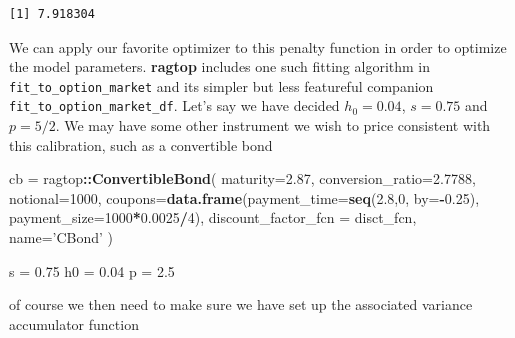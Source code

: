 \documentclass[]{article}
\newenvironment{Shaded}{\begin{snugshade}}{\end{snugshade}}
\newcommand{\KeywordTok}[1]{\textcolor[rgb]{0.13,0.29,0.53}{\textbf{#1}}}
\newcommand{\DataTypeTok}[1]{\textcolor[rgb]{0.13,0.29,0.53}{#1}}
\newcommand{\DecValTok}[1]{\textcolor[rgb]{0.00,0.00,0.81}{#1}}
\newcommand{\FloatTok}[1]{\textcolor[rgb]{0.00,0.00,0.81}{#1}}
\newcommand{\StringTok}[1]{\textcolor[rgb]{0.31,0.60,0.02}{#1}}
\newcommand{\OtherTok}[1]{\textcolor[rgb]{0.56,0.35,0.01}{#1}}
\newcommand{\ControlFlowTok}[1]{\textcolor[rgb]{0.13,0.29,0.53}{\textbf{#1}}}
\newcommand{\OperatorTok}[1]{\textcolor[rgb]{0.81,0.36,0.00}{\textbf{#1}}}
\newcommand{\NormalTok}[1]{#1}
\begin{document}
\begin{verbatim}
[1] 7.918304
\end{verbatim}

We can apply our favorite optimizer to this penalty function in order to
optimize the model parameters. \textbf{ragtop} includes one such fitting
algorithm in \texttt{fit\_to\_option\_market} and its simpler but less
featureful companion \texttt{fit\_to\_option\_market\_df}. Let's say we
have decided \(h_0=0.04\), \(s=0.75\) and \(p=5/2\). We may have some
other instrument we wish to price consistent with this calibration, such
as a convertible bond

\begin{Shaded}
\begin{Highlighting}[]
\NormalTok{cb =}\StringTok{ }\NormalTok{ragtop}\OperatorTok{::}\KeywordTok{ConvertibleBond}\NormalTok{(}
  \DataTypeTok{maturity=}\FloatTok{2.87}\NormalTok{, }\DataTypeTok{conversion_ratio=}\FloatTok{2.7788}\NormalTok{, }\DataTypeTok{notional=}\DecValTok{1000}\NormalTok{,}
  \DataTypeTok{coupons=}\KeywordTok{data.frame}\NormalTok{(}\DataTypeTok{payment_time=}\KeywordTok{seq}\NormalTok{(}\FloatTok{2.8}\NormalTok{,}\DecValTok{0}\NormalTok{, }\DataTypeTok{by=}\OperatorTok{-}\FloatTok{0.25}\NormalTok{),}
                     \DataTypeTok{payment_size=}\DecValTok{1000}\OperatorTok{*}\FloatTok{0.0025}\OperatorTok{/}\DecValTok{4}\NormalTok{),}
  \DataTypeTok{discount_factor_fcn =}\NormalTok{ disct_fcn,}
  \DataTypeTok{name=}\StringTok{'CBond'}
\NormalTok{)}

\NormalTok{s =}\StringTok{ }\FloatTok{0.75}
\NormalTok{h0 =}\StringTok{ }\FloatTok{0.04}
\NormalTok{p =}\StringTok{ }\FloatTok{2.5}
\end{Highlighting}
\end{Shaded}

of course we then need to make sure we have set up the associated
variance accumulator function

\begin{Shaded}
\end{Shaded}
\end{document}
